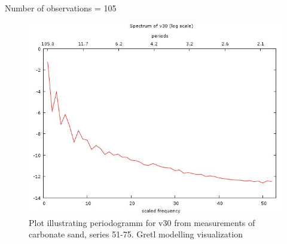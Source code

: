 \documentclass[10pt, a4paper]{article}
\begin{document}
\begin{appendices}
\begin{table}[H]
\begin{small}
\begin{center}
\begin{tabular}{|p{15mm} p{15mm} p{15mm} p{15mm} || p{15mm} p{15mm}p{15mm} p{15mm}|}
\end{tabular}
\end{center}
\end{small}
Number of observations = 105
\label{fig:5}
\end{table}
\begin{figure}[H]
\begin{center}
\includegraphics[scale=0.25]{G-period-sand30.jpg}
\caption{Plot illustrating periodogramm for v30 from measurements of carbonate sand, series 51-75. Gretl modelling visualization­}
\label{fig:57}
\end{center}
\end{figure}
\pagebreak


\end{appendices}
\end{document}
